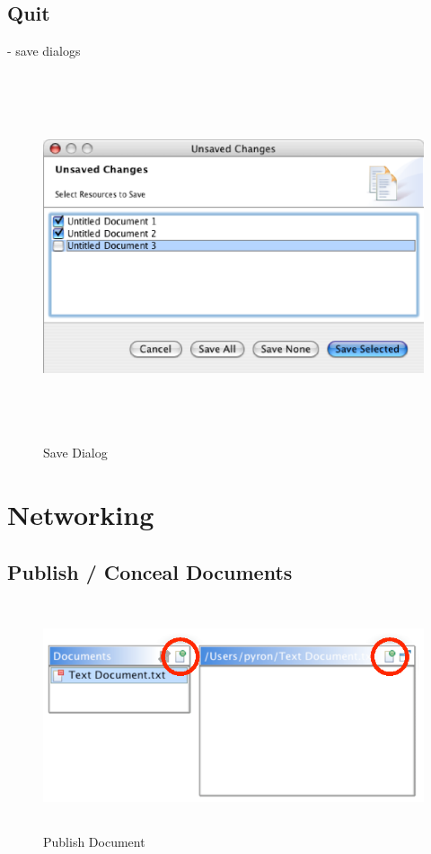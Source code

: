 \documentclass[11pt,a4paper]{article}
\begin{document}
\subsection{Quit}
- save dialogs

\begin{figure}[H]
\begin{center}
  \includegraphics[height=4.26in, width=6.96in]{../images/usermanual/ace_savedialog.eps}
\caption{Save Dialog}
\label{default}
\end{center}
\end{figure}




\newpage
\section{Networking}

\subsection{Publish / Conceal Documents}
\begin{figure}[H]
\begin{center}
  \includegraphics[height=2.64in, width=6.32in]{../images/usermanual/g_editor_view_publish.eps}
\caption{Publish Document}
\label{default}
\end{center}
\end{figure}
\end{document}
